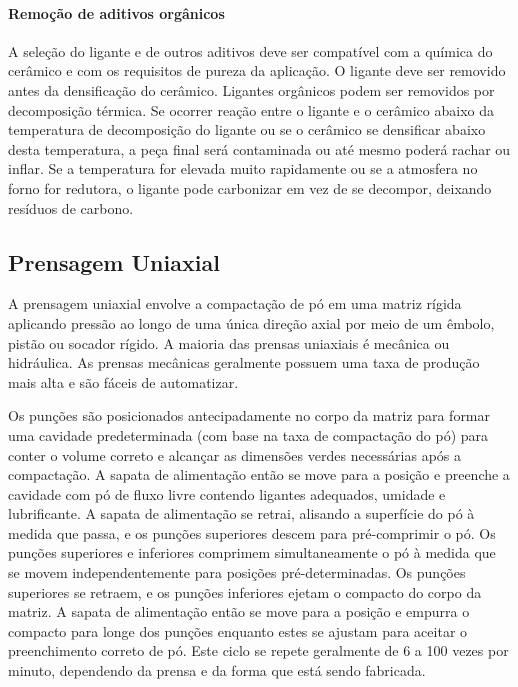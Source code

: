 \paragraph*{Remoção de aditivos orgânicos}

A seleção do ligante e de outros aditivos deve ser compatível com a química do cerâmico e com os requisitos de pureza da aplicação. O ligante deve ser removido antes da densificação do cerâmico. Ligantes orgânicos podem ser removidos por decomposição térmica. Se ocorrer reação entre o ligante e o cerâmico abaixo da temperatura de decomposição do ligante ou se o cerâmico se densificar abaixo desta temperatura, a peça final será contaminada ou até mesmo poderá rachar ou inflar. Se a temperatura for elevada muito rapidamente ou se a atmosfera no forno for redutora, o ligante pode carbonizar em vez de se decompor, deixando resíduos de carbono.

\subsection*{Prensagem Uniaxial}

A prensagem uniaxial envolve a compactação de pó em uma matriz rígida aplicando pressão ao longo de uma única direção axial por meio de um êmbolo, pistão ou socador rígido. A maioria das prensas uniaxiais é mecânica ou hidráulica. As prensas mecânicas geralmente possuem uma taxa de produção mais alta e são fáceis de automatizar.

Os punções são posicionados antecipadamente no corpo da matriz para formar uma cavidade predeterminada (com base na taxa de compactação do pó) para conter o volume correto e alcançar as dimensões verdes necessárias após a compactação. A sapata de alimentação então se move para a posição e preenche a cavidade com pó de fluxo livre contendo ligantes adequados, umidade e lubrificante. A sapata de alimentação se retrai, alisando a superfície do pó à medida que passa, e os punções superiores descem para pré-comprimir o pó. Os punções superiores e inferiores comprimem simultaneamente o pó à medida que se movem independentemente para posições pré-determinadas. Os punções superiores se retraem, e os punções inferiores ejetam o compacto do corpo da matriz. A sapata de alimentação então se move para a posição e empurra o compacto para longe dos punções enquanto estes se ajustam para aceitar o preenchimento correto de pó. Este ciclo se repete geralmente de 6 a 100 vezes por minuto, dependendo da prensa e da forma que está sendo fabricada.

